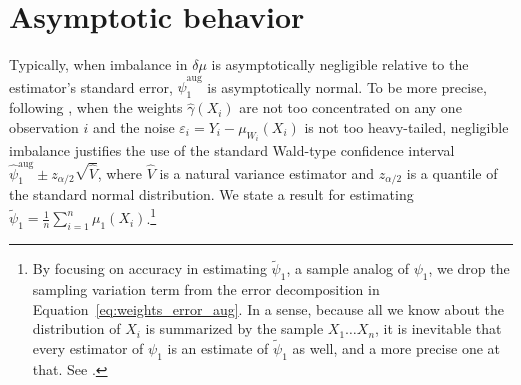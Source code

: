 \documentclass{article}
\theoremstyle{definition}
\newcommand{\dm}{\delta \mu}
\newcommand{\hgamma}{\ensuremath{\hat\gamma}}
\newcommand{\aug}{\text{aug}}
\newcommand{\<}{\langle}
\renewcommand{\>}{\rangle}
\begin{document}
\section{Asymptotic behavior}
\label{sec:asymptotic}
%
%
%


Typically, when imbalance in $\dm$ is asymptotically negligible relative to the estimator's standard error, $\hat{\psi}_1^{\aug}$ is asymptotically normal.
To be more precise, following \citet[see Corollary 6]{athey2018approximate}, when the
weights $\hgamma(X_i)$ are not too concentrated on any one observation $i$ and the noise $\varepsilon_i=Y_i-\mu_{W_i}(X_i)$ is not too heavy-tailed,
negligible imbalance justifies the use of the standard Wald-type confidence interval $\hat \psi_1^{\aug} \pm z_{\alpha/2} \sqrt{\hat V}$, where $\hat V$
is a natural variance estimator and $z_{\alpha/2}$ is a quantile of the standard normal distribution.
We state a result for estimating
$\tilde \psi_1 = \frac{1}{n}\sum_{i=1}^n \mu_1(X_i)$.\footnote{By focusing on  accuracy in estimating $\tilde \psi_1$, a sample analog of $\psi_1$, we drop the sampling variation term from the error decomposition in Equation~\ref{eq:weights_error_aug}. In a sense, because all we
know about the distribution of $X_i$ is summarized by the sample $X_1 \ldots X_n$, it is inevitable that every estimator of $\psi_1$ is
an estimate of $\tilde \psi_1$ as well, and a more precise one at that. See \citet{imbens2004nonparametric}.}
\end{document}

